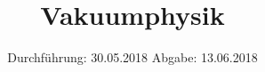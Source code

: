 

\subject{VERSUCH NUMMER 70}
\title{Vakuumphysik}
\date{
  Durchführung: 30.05.2018
  \hspace{3em}
  Abgabe: 13.06.2018
}



\thispagestyle{empty}
\maketitle
\thispagestyle{empty}
\tableofcontents
\newpage
\setcounter{page}{1}


% 




\nocite{*}
\printbibliography


